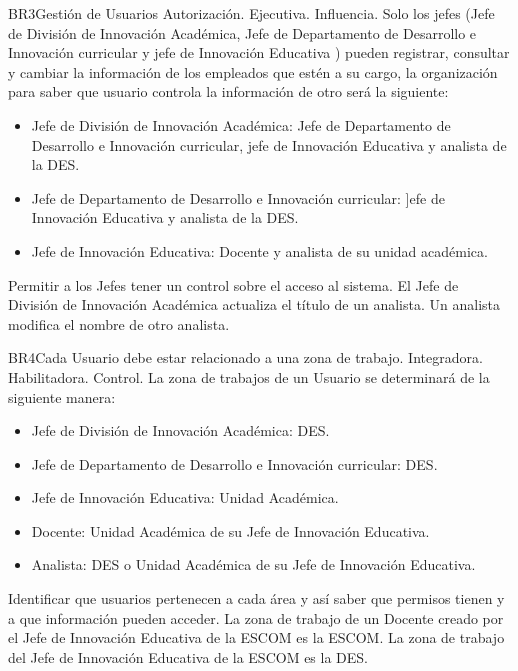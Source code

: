 \begin{BussinesRule}{BR3}{Gestión de Usuarios}
    \BRitem[Tipo:] Autorización.
    \BRitem[Clase:] Ejecutiva.
    \BRitem[Nivel:] Influencia.
    \BRitem[Descripción:] Solo los jefes (Jefe de División de Innovación Académica, Jefe de Departamento de Desarrollo e Innovación curricular y jefe de Innovación Educativa ) pueden registrar, consultar y cambiar  la información de los empleados que estén a su cargo, la organización para saber que usuario controla  la información de otro  será la siguiente:
    \begin{itemize}
        \item Jefe de División de Innovación Académica: Jefe de Departamento de Desarrollo e Innovación curricular, jefe de Innovación Educativa y analista de la DES.
        \item Jefe de Departamento de Desarrollo e Innovación curricular: ]efe de Innovación Educativa y analista de la DES.
        \item Jefe de Innovación Educativa: Docente y analista de su unidad académica.
    \end{itemize}
    \BRitem[Motivación:] Permitir a los Jefes tener un control sobre el acceso al sistema.
     El Jefe de División de Innovación Académica  actualiza el título de un analista.
     Un analista modifica  el nombre de otro analista.
\end{BussinesRule}
\begin{BussinesRule}{BR4}{Cada Usuario debe estar relacionado a una zona de trabajo.}
    \BRitem[Tipo:] Integradora.
    \BRitem[Clase:] Habilitadora.
    \BRitem[Nivel:] Control.
    \BRitem[Descripción:] La zona de trabajos de un Usuario se determinará de la siguiente manera:
    \begin{itemize}
        \item Jefe de División de Innovación Académica: DES.
        \item Jefe de Departamento de Desarrollo e Innovación curricular: DES.
        \item Jefe de Innovación Educativa: Unidad Académica.
        \item Docente: Unidad Académica de su Jefe de Innovación Educativa.
        \item Analista:  DES o Unidad Académica de su Jefe de Innovación Educativa.
    \end{itemize}
    \BRitem[Motivación:] Identificar que usuarios pertenecen a cada área y así saber que permisos tienen y a que información pueden acceder.
     La zona de trabajo de un Docente creado por el Jefe de Innovación Educativa de la ESCOM es la ESCOM.
     La zona de trabajo del Jefe de Innovación Educativa de la ESCOM es la DES.
\end{BussinesRule}
